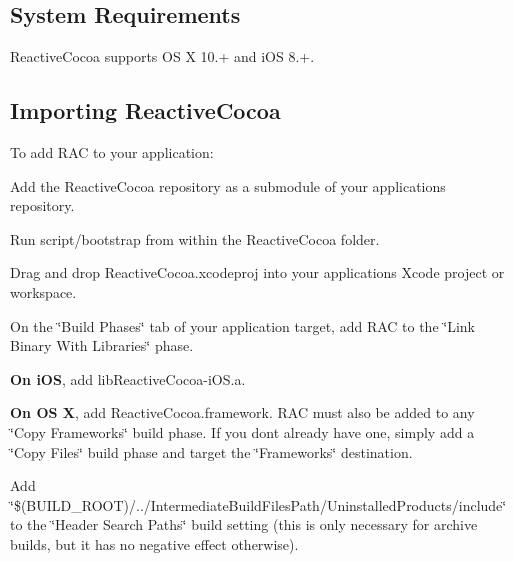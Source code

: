\subsection*{System Requirements}

Reactive\+Cocoa supports OS X 10.+ and i\+OS 8.+.

\subsection*{Importing Reactive\+Cocoa}

To add R\+AC to your application\+:


\begin{DoxyEnumerate}
\item Add the Reactive\+Cocoa repository as a submodule of your application\textquotesingle{}s repository.
\end{DoxyEnumerate}
\begin{DoxyEnumerate}
\item Run {\ttfamily script/bootstrap} from within the Reactive\+Cocoa folder.
\end{DoxyEnumerate}
\begin{DoxyEnumerate}
\item Drag and drop {\ttfamily Reactive\+Cocoa.\+xcodeproj} into your application\textquotesingle{}s Xcode project or workspace.
\end{DoxyEnumerate}
\begin{DoxyEnumerate}
\item On the \char`\"{}\+Build Phases\char`\"{} tab of your application target, add R\+AC to the \char`\"{}\+Link
    Binary With Libraries\char`\"{} phase.
\begin{DoxyItemize}
\item {\bfseries On i\+OS}, add {\ttfamily lib\+Reactive\+Cocoa-\/i\+O\+S.\+a}.
\item {\bfseries On OS X}, add {\ttfamily Reactive\+Cocoa.\+framework}. R\+AC must also be added to any \char`\"{}\+Copy Frameworks\char`\"{} build phase. If you don\textquotesingle{}t already have one, simply add a \char`\"{}\+Copy Files\char`\"{} build phase and target the \char`\"{}\+Frameworks\char`\"{} destination.
\end{DoxyItemize}
\end{DoxyEnumerate}
\begin{DoxyEnumerate}
\item Add {\ttfamily \char`\"{}\$(\+B\+U\+I\+L\+D\+\_\+\+R\+O\+O\+T)/../\+Intermediate\+Build\+Files\+Path/\+Uninstalled\+Products/include\char`\"{} } to the \char`\"{}\+Header Search Paths\char`\"{} build setting (this is only necessary for archive builds, but it has no negative effect otherwise).
\end{DoxyEnumerate}
